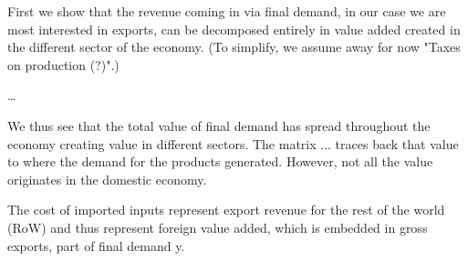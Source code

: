 \documentclass[12pt,english]{article}
\begin{document}
First we show that the revenue coming in via final demand, in our case we are most interested in exports, can be decomposed entirely in value added created in the different sector of the economy. (To simplify, we assume away for now "Taxes on production (?)".)

\ldots

We thus see that the total value of final demand has spread throughout the economy creating value in different sectors. The matrix ... traces back that value to where the demand for the products generated. However, not all the value originates in the domestic economy. 

The cost of imported inputs represent export revenue for the rest of the world (RoW) and thus represent foreign value added, which is embedded in gross exports, part of final demand y. 

\end{document}
